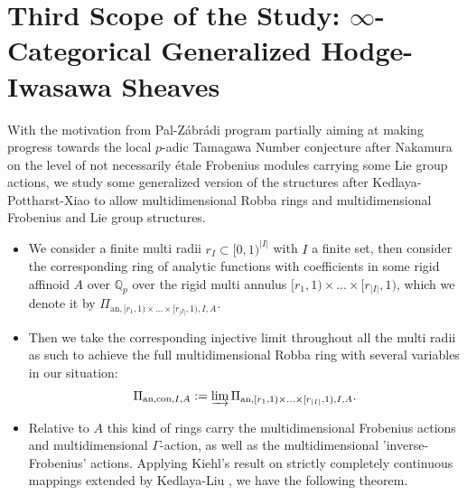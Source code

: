\documentclass[11pt]{report}
\begin{document}
\section{Third Scope of the Study: $\infty$-Categorical Generalized Hodge-Iwasawa Sheaves}

\indent With the motivation from Pal-Z\'abr\'adi program \cite{PZ} partially aiming at making progress towards the local $p$-adic Tamagawa Number conjecture after Nakamura \cite{N2} on the level of not necessarily \'etale Frobenius modules carrying some Lie group actions, we study some generalized version of the structures after Kedlaya-Pottharst-Xiao \cite{KPX} to allow multidimensional Robba rings and multidimensional Frobenius and Lie group structures. 
\begin{itemize}
\justifying
\item<1-> We consider a finite multi radii $r_I\subset [0,1)^{|I|}$ with $I$ a finite set, then consider the corresponding ring of analytic functions with coefficients in some rigid affinoid $A$ over $\mathbb{Q}_p$ over the rigid multi annulus $[r_1,1)\times...\times [r_{|I|},1)$, which we denote it by $\Pi_{\mathrm{an},[r_1,1)\times...\times [r_{|I|},1),I,A}$. 

\item<2-> Then we take the corresponding injective limit throughout all the multi radii as such to achieve the full multidimensional Robba ring with several variables in our situation:
\begin{align}
\Pi_{\mathrm{an},\mathrm{con},I,A}:=\varinjlim \Pi_{\mathrm{an},[r_1,1)\times...\times [r_{|I|},1),I,A}.	
\end{align}

\item<3-> Relative to $A$ this kind of rings carry the multidimensional Frobenius actions and multidimensional $\Gamma$-action, as well as the multidimensional 'inverse-Frobenius' actions. Applying Kiehl's result \cite[Satz 5.2]{Kie} on strictly completely continuous mappings extended by Kedlaya-Liu \cite{KL3}, we have the following theorem.
	
\end{itemize}
\end{document}
